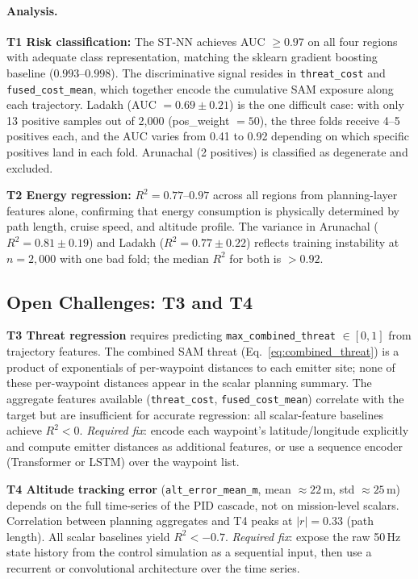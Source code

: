 \documentclass{article}
\begin{document}
\paragraph{Analysis.}
\textbf{T1 Risk classification:} The ST-NN achieves AUC $\geq 0.97$
on all four regions with adequate class representation, matching the
sklearn gradient boosting baseline ($0.993$--$0.998$). The discriminative
signal resides in \texttt{threat\_cost} and \texttt{fused\_cost\_mean},
which together encode the cumulative SAM exposure along each trajectory.
Ladakh (AUC $= 0.69 \pm 0.21$) is the one difficult case: with only 13
positive samples out of 2{,}000 (pos\_weight $= 50$), the three folds
receive 4--5 positives each, and the AUC varies from 0.41 to 0.92 depending
on which specific positives land in each fold. Arunachal (2 positives)
is classified as degenerate and excluded.

\textbf{T2 Energy regression:} $R^2 = 0.77$--$0.97$ across all regions
from planning-layer features alone, confirming that energy consumption
is physically determined by path length, cruise speed, and altitude profile.
The variance in Arunachal ($R^2 = 0.81 \pm 0.19$) and Ladakh
($R^2 = 0.77 \pm 0.22$) reflects training instability at $n = 2{,}000$
with one bad fold; the median $R^2$ for both is $> 0.92$.

\subsection{Open Challenges: T3 and T4}
\label{sec:open_challenges}

\textbf{T3 Threat regression} requires predicting \texttt{max\_combined\_threat}
$\in [0,1]$ from trajectory features. The combined SAM threat
(Eq.~\ref{eq:combined_threat}) is a product of exponentials of per-waypoint
distances to each emitter site; none of these per-waypoint distances appear
in the scalar planning summary. The aggregate features available
(\texttt{threat\_cost}, \texttt{fused\_cost\_mean}) correlate with the target
but are insufficient for accurate regression: all scalar-feature baselines
achieve $R^2 < 0$.
\emph{Required fix}: encode each waypoint's latitude/longitude explicitly
and compute emitter distances as additional features, or use a sequence
encoder (Transformer or LSTM) over the waypoint list.

\textbf{T4 Altitude tracking error} (\texttt{alt\_error\_mean\_m}, mean $\approx 22$\,m,
std $\approx 25$\,m) depends on the full time-series of the PID cascade, not
on mission-level scalars. Correlation between planning aggregates and T4
peaks at $|r| = 0.33$ (path length). All scalar baselines yield $R^2 < -0.7$.
\emph{Required fix}: expose the raw 50\,Hz state history from the control
simulation as a sequential input, then use a recurrent or convolutional
architecture over the time series.
\end{document}

